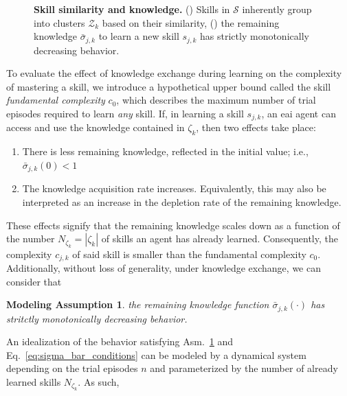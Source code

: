 \documentclass[12pt]{article}
\renewcommand{\emph}[1]{\textit{#1}}
\newtheorem{assumption}{Modeling Assumption}
\begin{document}
\begin{figure}[!t]
\begin{subfigure}[t]{7.5cm}
	\end{subfigure}
	\hspace*{\fill}
	\caption[] {\label{fig:experimental_results} \textbf{Skill similarity and knowledge.} () Skills in $\mathcal{S}$ inherently group into clusters $\mathcal{Z}_k$ based on their similarity, () the remaining knowledge $\bar{\sigma}_{j,k}$ to learn a new skill $s_{j,k}$ has strictly monotonically decreasing behavior.}	
\end{figure}

To evaluate the effect of knowledge exchange during learning on the complexity of mastering a skill, we introduce a hypothetical upper bound called the skill \textit{fundamental complexity} $c_0$, which describes the maximum number of trial episodes required to learn \emph{any} skill. If, in learning a skill $ s_{j,k} $, an \ac{eai} agent can access and use the knowledge contained in $\mathcal{\zeta}_k$, then two effects take place:
\begin{enumerate}
	\item There is less remaining knowledge, reflected in the initial value; i.e., $\bar{\sigma}_{j,k}(0) < 1$
	\item The knowledge acquisition rate increases. Equivalently, this may also be interpreted as an increase in the depletion rate of the remaining knowledge.
\end{enumerate}
These effects signify that the remaining knowledge scales down as a function of the number $N_{\zeta_k}=|\mathcal{\zeta}_k|$ of skills an agent has already learned. Consequently, the complexity $c_{j,k}$ of said skill is smaller than the fundamental complexity $c_0$. Additionally, without loss of generality, under knowledge exchange, we can consider that
\begin{tcolorbox}
	\begin{assumption}\label{assumption:exponential_decrease} the remaining knowledge function $\bar{\sigma}_{j,k}(\cdot)$ has stritctly monotonically decreasing behavior.
	\end{assumption}
\end{tcolorbox} 
\noindent An idealization of the behavior satisfying Asm.~\ref{assumption:exponential_decrease} and Eq.~\eqref{eq:sigma_bar_conditions} can be modeled by a dynamical system depending on the trial episodes $n$ and parameterized by the number of already learned skills $N_{\zeta_k}$. As such,
\end{document}
